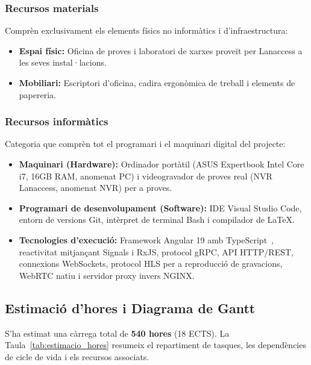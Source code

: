 \subsubsection{Recursos materials}
Comprèn exclusivament els elements físics no informàtics i d'infraestructura:
\begin{itemize}
  \item \textbf{Espai físic:} Oficina de proves i laboratori de xarxes proveït per Lanaccess a les seves instal·lacions.
  \item \textbf{Mobiliari:} Escriptori d'oficina, cadira ergonòmica de treball i elements de papereria.
\end{itemize}

\subsubsection{Recursos informàtics}
Categoria que comprèn tot el programari i el maquinari digital del projecte:
\begin{itemize}
  \item \textbf{Maquinari (Hardware):} Ordinador portàtil (ASUS Expertbook Intel Core i7, 16GB RAM, anomenat PC) i videogravador de proves real (NVR Lanaccess, anomenat NVR) per a proves.
  \item \textbf{Programari de desenvolupament (Software):} IDE Visual Studio Code, entorn de versions Git, intèrpret de terminal Bash i compilador de LaTeX.
  \item \textbf{Tecnologies d'execució:} Framework Angular 19 amb TypeScript~\cite{typescript_spec}, reactivitat mitjançant Signals i RxJS, protocol gRPC, API HTTP/REST, connexions WebSockets, protocol HLS per a reproducció de gravacions, WebRTC natiu i servidor proxy invers NGINX.
\end{itemize}

\subsection{Estimació d'hores i Diagrama de Gantt}
S'ha estimat una càrrega total de \textbf{540 hores} (18 ECTS). La Taula~\ref{tab:estimacio_hores} resumeix el repartiment de tasques, les dependències de cicle de vida i els recursos associats.

